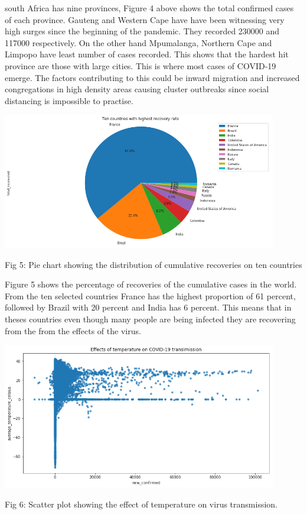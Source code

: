 \documentclass[12pt]{article}
\begin{document}
south Africa has nine provinces, Figure 4 above shows the total confirmed cases of each province. Gauteng and Western Cape have have been witnessing very high surges since the beginning of the pandemic. They recorded 230000 and 117000 respectively. On the other hand Mpumalanga, Northern Cape and Limpopo have least number of cases recorded. This shows that the hardest hit province are those with large cities. This is where most cases  of COVID-19 emerge. The factors contributing to this could be inward migration and increased congregations in high density areas causing cluster outbreaks since social distancing is impossible to practise. 

\centering
\includegraphics[width=0.9\textwidth, inner]{pie1.png}
\caption{Fig 5: Pie chart showing the distribution of cumulative recoveries on ten countries}

Figure 5 shows the percentage of recoveries of the cumulative cases in the world. From the ten selected countries France has the highest proportion of 61 percent, followed by Brazil with 20 percent and India has 6 percent. This means that in theses countries even though many people are being infected they are recovering from the from the effects of the virus.

\centering
\includegraphics[width=0.9\textwidth, inner]{scatter.png}
\caption{Fig 6: Scatter plot showing the effect of temperature on virus transmission.}
\end{document}

